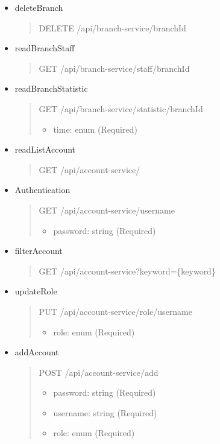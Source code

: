 \begin{itemize}
	\item deleteBranch
	      \begin{quote}
		      DELETE /api/branch-service/{branchId}
	      \end{quote}

	\item readBranchStaff
	      \begin{quote}
		      GET /api/branch-service/staff/{branchId}
	      \end{quote}

	\item readBranchStatistic
	      \begin{quote}
		      GET /api/branch-service/statistic/{branchId}
		      \begin{itemize}
			      \item time: enum (Required)
		      \end{itemize}
	      \end{quote}
\end{itemize}

\begin{itemize}
	\item readListAccount
	      \begin{quote}
		      GET /api/account-service/
	      \end{quote}

	\item Authentication
	      \begin{quote}
		      GET /api/account-service/{username}
		      \begin{itemize}
			      \item password: string (Required)
		      \end{itemize}
	      \end{quote}

	\item filterAccount
	      \begin{quote}
		      GET /api/account-service?keyword=\{keyword\}
	      \end{quote}

	\item updateRole
	      \begin{quote}
		      PUT /api/account-service/role/{username}
		      \begin{itemize}
			      \item role: enum (Required)
		      \end{itemize}
	      \end{quote}

	\item addAccount
	      \begin{quote}
		      POST /api/account-service/add
		      \begin{itemize}
			      \item password: string (Required)
			      \item username: string (Required)
			      \item role: enum (Required)
		      \end{itemize}
	      \end{quote}
\end{itemize}

